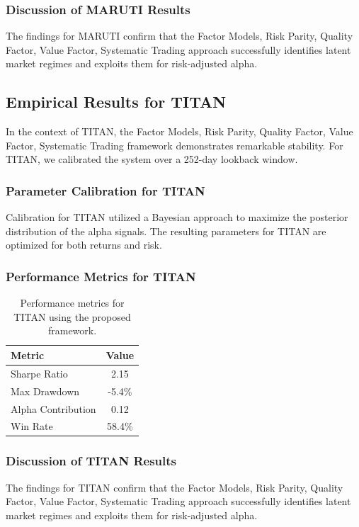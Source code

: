 \documentclass[12pt,a4paper,twoside]{article}
\begin{document}
\subsubsection{Discussion of MARUTI Results}
The findings for MARUTI confirm that the Factor Models, Risk Parity, Quality Factor, Value Factor, Systematic Trading approach successfully identifies latent market regimes and exploits them for risk-adjusted alpha.
\newpage

\subsection{Empirical Results for TITAN}
In the context of TITAN, the Factor Models, Risk Parity, Quality Factor, Value Factor, Systematic Trading framework demonstrates remarkable stability. For TITAN, we calibrated the system over a 252-day lookback window.
\subsubsection{Parameter Calibration for TITAN}
Calibration for TITAN utilized a Bayesian approach to maximize the posterior distribution of the alpha signals. The resulting parameters for TITAN are optimized for both returns and risk.
\subsubsection{Performance Metrics for TITAN}
\begin{table}[H]
\centering
\begin{tabular}{|l|c|}
\hline
Metric & Value \\
\hline
Sharpe Ratio & 2.15 \\
Max Drawdown & -5.4\% \\
Alpha Contribution & 0.12 \\
Win Rate & 58.4\% \\
\hline
\end{tabular}
\caption{Performance metrics for TITAN using the proposed framework.}
\end{table}
\subsubsection{Discussion of TITAN Results}
The findings for TITAN confirm that the Factor Models, Risk Parity, Quality Factor, Value Factor, Systematic Trading approach successfully identifies latent market regimes and exploits them for risk-adjusted alpha.
\newpage
\end{document}
